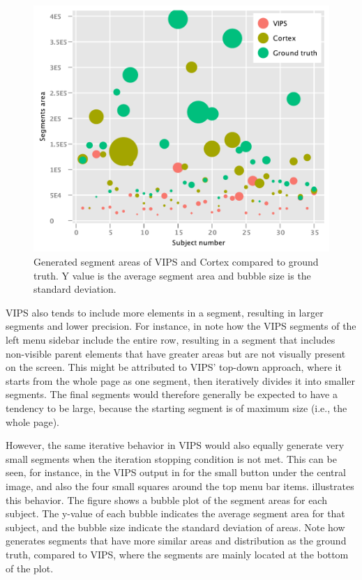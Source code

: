 \begin{figure}
    \centering
    \includegraphics[trim=0 0 0 0,clip,scale=0.56]{figures/results-and-discussion/segment-area-plot.pdf}
    \caption{Generated segment areas of VIPS and Cortex compared to ground truth.
    Y value is the average segment area and bubble size is the standard deviation.}
    \label{fig:segment-area}
\end{figure}

VIPS also tends to include more elements in a segment,
resulting in larger segments and lower precision.
For instance, in  note how the VIPS segments
of the left menu sidebar include the entire row,
resulting in a segment that includes non-visible parent elements that have greater
areas but are not visually present on the screen.
This might be attributed to VIPS' top-down approach,
where it starts from the whole page as one segment,
then iteratively divides it into smaller segments.
The final segments would therefore generally be
expected to have a tendency to be large, because the starting segment
is of maximum size (i.e., the whole page).

However, the same iterative behavior in VIPS would also equally
generate very small segments when the iteration stopping condition is not met.
This can be seen, for instance, in the VIPS output in 
for the small button under the central image, and also the four small squares
around the top menu bar items.
 illustrates this behavior.
The figure shows a bubble plot of the segment areas for each subject.
The y-value of each bubble indicates the average segment area for that subject,
and the bubble size indicate the standard deviation of areas.
Note how \toolname generates segments that have more similar areas and distribution
as the ground truth, compared to VIPS, where the segments are mainly located
at the bottom of the plot.

